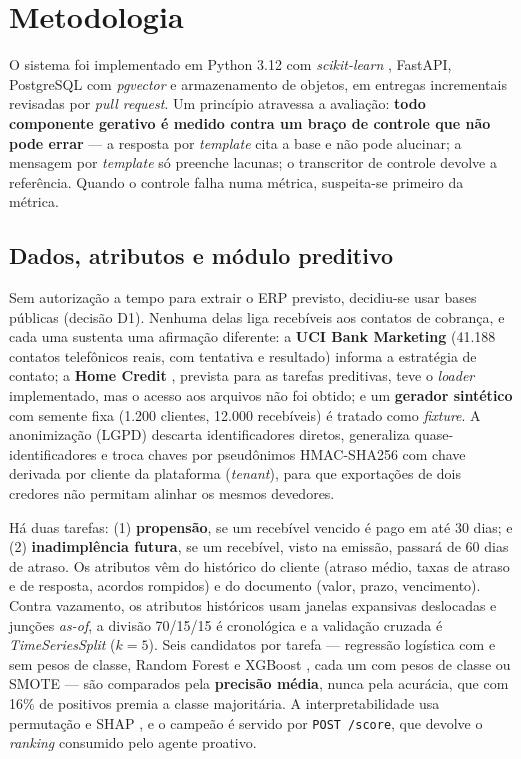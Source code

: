 \documentclass[portuguese]{sbcreviews-2025}%
\begin{document}
\section{Metodologia}
\label{sec:metodologia}

O sistema foi implementado em Python 3.12 com \textit{scikit-learn} \cite{pedregosa2011scikit}, FastAPI, PostgreSQL com \textit{pgvector} e armazenamento de objetos, em entregas incrementais revisadas por \textit{pull request}. Um princípio atravessa a avaliação: \textbf{todo componente gerativo é medido contra um braço de controle que não pode errar} --- a resposta por \textit{template} cita a base e não pode alucinar; a mensagem por \textit{template} só preenche lacunas; o transcritor de controle devolve a referência. Quando o controle falha numa métrica, suspeita-se primeiro da métrica.

\subsection{Dados, atributos e módulo preditivo}
\label{sec:dados}

Sem autorização a tempo para extrair o ERP previsto, decidiu-se usar bases públicas (decisão D1). Nenhuma delas liga recebíveis aos contatos de cobrança, e cada uma sustenta uma afirmação diferente: a \textbf{UCI Bank Marketing} \cite{moro2014data} (41.188 contatos telefônicos reais, com tentativa e resultado) informa a estratégia de contato; a \textbf{Home Credit} \cite{homecredit2018}, prevista para as tarefas preditivas, teve o \textit{loader} implementado, mas o acesso aos arquivos não foi obtido; e um \textbf{gerador sintético} com semente fixa (1.200 clientes, 12.000 recebíveis) é tratado como \textit{fixture}. A anonimização (LGPD) descarta identificadores diretos, generaliza quase-identificadores e troca chaves por pseudônimos HMAC-SHA256 com chave derivada por cliente da plataforma (\textit{tenant}), para que exportações de dois credores não permitam alinhar os mesmos devedores.

Há duas tarefas: (1) \textbf{propensão}, se um recebível vencido é pago em até 30 dias; e (2) \textbf{inadimplência futura}, se um recebível, visto na emissão, passará de 60 dias de atraso. Os atributos vêm do histórico do cliente (atraso médio, taxas de atraso e de resposta, acordos rompidos) e do documento (valor, prazo, vencimento). Contra vazamento, os atributos históricos usam janelas expansivas deslocadas e junções \textit{as-of}, a divisão 70/15/15 é cronológica e a validação cruzada é \textit{TimeSeriesSplit} ($k=5$). Seis candidatos por tarefa --- regressão logística com e sem pesos de classe, Random Forest \cite{breiman2001random} e XGBoost \cite{chen2016xgboost}, cada um com pesos de classe ou SMOTE \cite{chawla2002smote} --- são comparados pela \textbf{precisão média}, nunca pela acurácia, que com 16\% de positivos premia a classe majoritária. A interpretabilidade usa permutação e SHAP \cite{lundberg2017unified}, e o campeão é servido por \texttt{POST /score}, que devolve o \textit{ranking} consumido pelo agente proativo.
\end{document}
